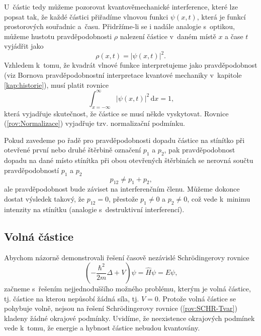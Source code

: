 U~částic tedy můžeme pozorovat kvantověmechanické interference, které lze popsat tak, že každé částici přiřadíme vlnovou funkci $\psi(x, t)$, která je funkcí prostorových souřadnic a~času. Přidržíme-li se i nadále analogie s~optikou, můžeme hustotu pravděpodobnosti $\rho$ nalezení částice v~daném místě $x$ a čase $t$ vyjádřit jako
\begin{equation}
\rho(x, t) = |\psi(x,t)|^2 \mbox{.}
\label{rov:VlnovaFce-castice}
\end{equation}
Vzhledem k~tomu, že kvadrát vlnové funkce interpretujeme jako pravděpodobnost (viz Bornova pravděpodobnostní interpretace kvantové mechaniky v~kapitole \ref{kap:historie}), musí platit rovnice
\begin{equation}
\int_{x=-\infty}^\infty |\psi(x,t)|^2 \,\mathrm{d}x = 1 \mbox{,}
\label{rov:Normalizace}
\end{equation}
která vyjadřuje skutečnost, že částice se musí někde vyskytovat. Rovnice (\ref{rov:Normalizace}) vyjadřuje tzv. normalizační podmínku.

Pokud zavedeme po řadě pro pravděpodobnosti dopadu částice na stínítko při otevřené první nebo druhé štěrbině označení $p_1$ a $p_2$, pak pravděpodobnost dopadu na dané místo stínítka při obou otevřených štěrbinách se nerovná součtu pravděpodobností $p_1$ a $p_2$
\begin{equation}
p_{12} \not = p_1 + p_2 \mbox{,}
\label{rov:Pravdepodobnosti-Stinitko}
\end{equation}
ale pravděpodobnost bude záviset na interferenčním členu. Můžeme dokonce dostat výsledek takový, že $p_{12} = 0$, přestože $p_1 \not =  0$ a $p_2 \not = 0$, což vede k~minimu intenzity na stínítku (analogie s~destruktivní interferencí).

\subsection{Volná částice}
\label{kap:VolnaCastice}

Abychom názorně demonstrovali řešení časově nezávislé Schrödingerovy rovnice
\begin{equation}
(- \frac{\hbar^2}{2m} \Delta + V) \psi = \hat{H} \psi = E \psi \mbox{,}
\label{rov:SCHR-Tvar}
\end{equation}
začneme s~řešením nejjednoduššího možného problému, kterým je volná částice, tj. částice na kterou nepůsobí žádná síla, tj. $V = 0$. Protože volná částice se pohybuje volně, nejsou na řešení Schrödingerovy rovnice (\ref{rov:SCHR-Tvar}) kladeny žádné okrajové podmínky. Uvidíme, že neexistence okrajových podmínek vede k~tomu, že energie a hybnost částice nebudou kvantovány.

